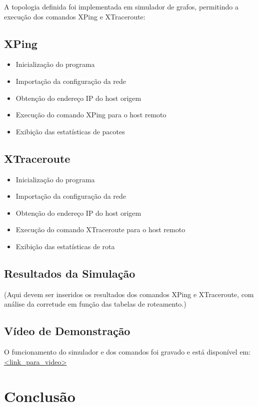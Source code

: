 \documentclass[conference,compsoc]{IEEEtran}
\begin{document}
\begin{otherlanguage}{brazil}
A topologia definida foi implementada em simulador de grafos, permitindo a execução dos comandos XPing e XTraceroute:

\subsection{XPing}
\begin{itemize}
    \item Inicialização do programa
    \item Importação da configuração da rede
    \item Obtenção do endereço IP do host origem
    \item Execução do comando XPing para o host remoto
    \item Exibição das estatísticas de pacotes
\end{itemize}

\subsection{XTraceroute}
\begin{itemize}
    \item Inicialização do programa
    \item Importação da configuração da rede
    \item Obtenção do endereço IP do host origem
    \item Execução do comando XTraceroute para o host remoto
    \item Exibição das estatísticas de rota
\end{itemize}

\subsection{Resultados da Simulação}

(Aqui devem ser inseridos os resultados dos comandos XPing e XTraceroute, com análise da corretude em função das tabelas de roteamento.)

\subsection{Vídeo de Demonstração}

O funcionamento do simulador e dos comandos foi gravado e está disponível em: \\ 
\url{<link_para_video>}

\section{Conclusão}


\end{otherlanguage}
\end{document}
